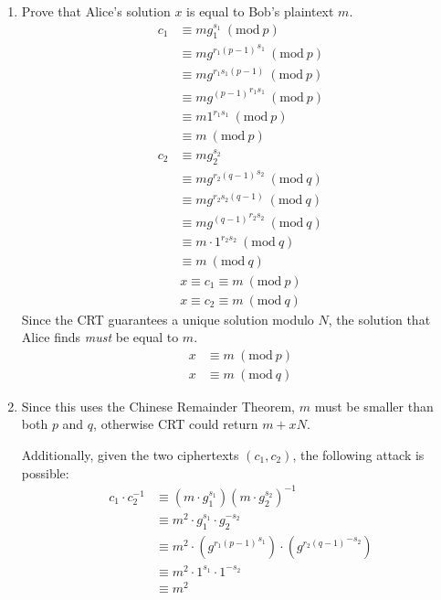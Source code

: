 \documentclass{article}
\newcommand{\Mod}[1]{\ (\mathrm{mod}\ #1)}
\begin{document}
\begin{enumerate}[label=(\alph*)]
    \item Prove that Alice's solution \(x\) is equal to Bob's plaintext \(m\).
          \begin{align*}
              c_1 & \equiv mg_1^{s_1}            \Mod{p}      \\
                  & \equiv {mg^{r_1(p-1)}}^{s_1} \Mod{p}      \\
                  & \equiv {mg^{r_1s_1(p-1)}}    \Mod{p}      \\
                  & \equiv {mg^{(p-1)}}^{r_1s_1} \Mod{p}      \\
                  & \equiv {m1}^{r_1s_1}         \Mod{p}      \\
                  & \equiv m \Mod{p}                          \\
              c_2 & \equiv mg_2^{s_2}                         \\
                  & \equiv {mg^{r_2(q-1)}}^{s_2} \Mod{q}      \\
                  & \equiv {mg^{r_2s_2(q-1)}}    \Mod{q}      \\
                  & \equiv {mg^{(q-1)}}^{r_2s_2} \Mod{q}      \\
                  & \equiv {m\cdot1}^{r_2s_2}         \Mod{q} \\
                  & \equiv m \Mod{q}
          \end{align*}
          \begin{align*}
              x \equiv c_1  \equiv m \Mod{p} \\
              x \equiv c_2  \equiv m \Mod{q}
          \end{align*}
          Since the CRT guarantees a unique solution modulo \(N\), the solution
          that Alice finds \textit{must} be equal to \(m\).
          \begin{align*}
              x & \equiv m \Mod{p} \\
              x & \equiv m \Mod{q}
          \end{align*}
    \item Since this uses the Chinese Remainder Theorem, \(m\) must be smaller than both \(p\) and \(q\),
          otherwise CRT could return \(m + xN\).

          Additionally, given the two ciphertexts \((c_1, c_2)\), the following attack is possible:
          \begin{align*}
              c_1 \cdot c_2 ^ {-1} & \equiv (m \cdot g_1^{s_1})(m\cdot g_2^{s_2})^{-1}                     \\
                                   & \equiv m^2 \cdot g_1^{s_1} \cdot g_2^{-s_2}                           \\
                                   & \equiv m^2 \cdot ({g^{r_1(p-1)}}^{s_1}) \cdot ({g^{r_2(q-1)}}^{-s_2}) \\
                                   & \equiv m^2 \cdot 1^{s_1} \cdot 1^{-s_2}                               \\
                                   & \equiv m^2
          \end{align*}
\end{enumerate}
\end{document}
